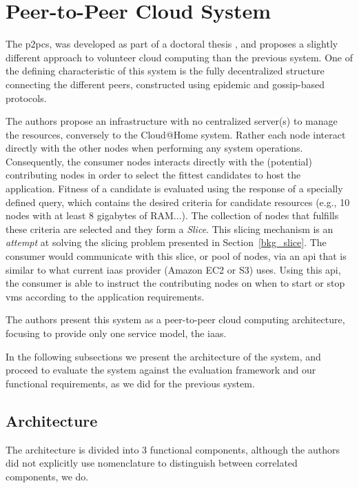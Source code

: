\documentclass[12pt, titlepage]{uo_temp}
\begin{document}
     \section{Peer-to-Peer Cloud System}
     The \gls{p2pcs}, was developed as part of a doctoral thesis \cite{P2PCS}, and
     proposes a slightly different approach to volunteer cloud computing than the previous
     system. One of the defining characteristic of this system is the fully decentralized
     structure connecting the different peers, constructed using epidemic and gossip-based
     protocols.

     The authors propose an infrastructure with no centralized server(s) to manage the
     resources, conversely to the Cloud@Home system. Rather each node interact directly
     with the other nodes when performing any system operations. Consequently, the
     consumer nodes interacts directly with the (potential) contributing nodes in order to
     select the fittest candidates to host the application. Fitness of a candidate is
     evaluated using the response of a specially defined query, which contains the desired
     criteria for candidate resources (e.g., 10 nodes with at least 8 gigabytes of
     RAM...). The collection of nodes that fulfills these criteria are selected and they
     form a \emph{Slice}. This slicing mechanism is an \emph{attempt} at solving the
     slicing problem presented in Section~\ref{bkg_slice}. The consumer would communicate
     with this slice, or pool of nodes, via an \gls{api} that is similar to what current
     \gls{iaas} provider (Amazon EC2 or S3) uses. Using this \gls{api}, the consumer is
     able to instruct the contributing nodes on when to start or stop \gls{vm}s according
     to the application requirements.

     The authors present this system as a peer-to-peer cloud computing architecture,
     focusing to provide only one service model, the \gls{iaas}. 
     
     In the following subsections we present the architecture of the system, and proceed
     to evaluate the system against the evaluation framework and our functional
     requirements, as we did for the previous system.

     \subsection{Architecture}
     The architecture is divided into 3 functional components, although the authors did
     not explicitly use nomenclature to distinguish between correlated components, we do. 
\end{document}
